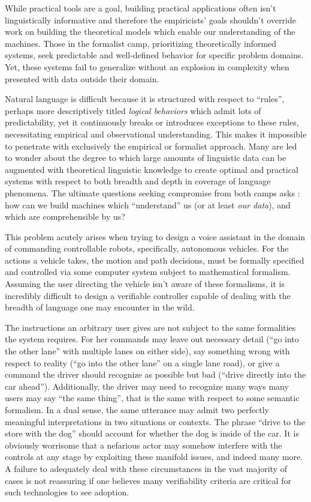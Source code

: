 \documentclass{article}
\begin{document}
While practical tools are a goal, building practical applications often isn't
linguistically informative and therefore the empiricists' goals shouldn't
override work on building the theoretical models which enable our understanding
of the machines. Those in the formalist camp, prioritizing theoretically
informed systems, seek predictable and well-defined behavior for specific
problem domains. Yet, these systems fail to generalize without an explosion in
complexity when presented with data outside their domain.

Natural language is difficult because it is structured with respect to
``rules'', perhaps more descriptively titled \emph{logical behaviors} which
admit lots of predictability, yet it continuously breaks or introduces
exceptions to these rules, necessitating empirical and observational
understanding. This makes it impossible to penetrate with exclusively the
empirical or formalist approach. Many are led to wonder about the degree to
which large amounts of linguistic data can be augmented with theoretical
linguistic knowledge to create optimal and practical systems with respect to
both breadth and depth in coverage of language phenomena. The ultimate questions
seeking compromise from both camps asks : how can we build machines which
``understand'' us (or at least \emph{our data}), and which are comprehensible by us?

This problem acutely arises when trying to design a voice assistant in the
domain of commanding controllable robots, specifically, autonomous vehicles. For
the actions a vehicle takes, the motion and path decisions, must be formally
specified and controlled via some computer system subject to mathematical
formalism. Assuming the user directing the vehicle isn't aware of these
formalisms, it is incredibly difficult to design a verifiable controller capable
of dealing with the breadth of language one may encounter in the wild.

The instructions an arbitrary user gives are not subject to the same formalities
the system requires. For her commands may leave out necessary detail (``go into
the other lane'' with multiple lanes on either side), say something wrong with
respect to reality (``go into the other lane'' on a single lane road), or give a
command the driver should recognize as possible but bad (``drive directly
into the car ahead''). Additionally, the driver may need to recognize many
ways many users may say ``the same thing'', that is the same with respect to
some semantic formalism. In a dual sense, the same utterance may admit two
perfectly meaningful interpretations in two situations or contexts. The phrase
``drive to the store with the dog'' should account for whether the dog is inside
of the car. It is obviously worrisome that a nefarious actor may somehow
interfere with the controls at any stage by exploiting these manifold issues,
and indeed many more. A failure to adequately deal with these circumstances in the
vast majority of cases is not reassuring if one believes many verifiability
criteria are critical for such technologies to see adoption.
\end{document}
